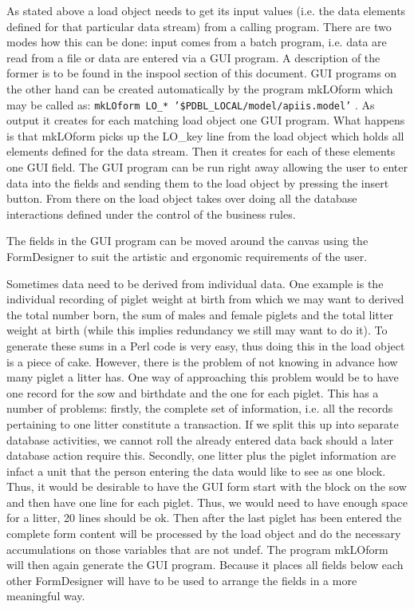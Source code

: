 As stated above a load object needs to get its input values (i.e.
the data elements defined for that particular data stream) from a
calling program. There are two modes how this can be done: input comes
from a batch program, i.e. data are read from a file or data are entered
via a GUI program. A description of the former is to be
found in the inspool section of this document. GUI programs on the
other hand can be created automatically by the program mkLOform which
may be called as: \texttt{mkLOform LO\_{*} '\$PDBL\_LOCAL/model/apiis.model'}
. As output it creates for each matching load object
one GUI program. What happens is that mkLOform picks up the LO\_key
line from the load object which holds all elements defined for the
data stream. Then it creates for each of these elements one GUI field.
The GUI program can be run right away allowing the user to enter data
into the fields and sending them to the load object by pressing the
insert button. From there on the load object takes over doing all
the database interactions defined under the control of the business
rules.

The fields in the GUI program can be moved around the canvas using
the FormDesigner to suit the artistic and ergonomic
requirements of the user.

Sometimes data need to be derived from individual data. One example
is the individual recording of piglet weight at birth from which we
may want to derived the total number born, the sum of males and female
piglets and the total litter weight at birth (while this implies redundancy
we still may want to do it). To generate these sums in a Perl code
is very easy, thus doing this in the load object is a piece of cake.
However, there is the problem of not knowing in advance how many piglet
a litter has. One way of approaching this problem would be to have
one record for the sow and birthdate and the one for each piglet.
This has a number of problems: firstly, the complete set of information,
i.e. all the records pertaining to one litter constitute a transaction.
If we split this up into separate database activities, we cannot roll
the already entered data back should a later database action require
this. Secondly, one litter plus the piglet information are infact
a unit that the person entering the data would like to see as one
block. Thus, it would be desirable to have the GUI form start with
the block on the sow and then have one line for each piglet. Thus,
we would need to have enough space for a litter, 20 lines should be
ok. Then after the last piglet has been entered the complete form
content will be processed by the load object and do the necessary
accumulations on those variables that are not undef. The program mkLOform
 will then again generate the GUI program. Because
it places all fields below each other FormDesigner
will have to be used to arrange the fields in a more meaningful way.

